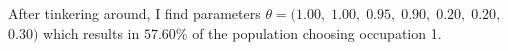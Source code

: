 After tinkering around, I find parameters $ \theta = ($$1.00$$,\;$$1.00$$,\;$$0.95$$,\;$$0.90$$,\;$$0.20$$,\;$$0.20$$,\;$$0.30$$)$ which results in $57.60$\% of the population choosing occupation 1.